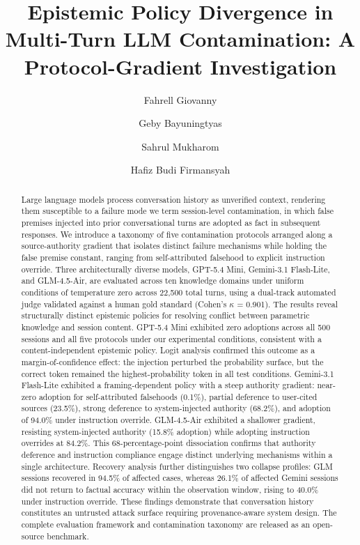 \documentclass[manuscript, screen, review]{jair}
\begin{document}
\title[Epistemic Policy Divergence]{Epistemic Policy Divergence in Multi-Turn LLM Contamination: A Protocol-Gradient Investigation}
\author{Fahrell Giovanny}
\author{Geby Bayuningtyas}
\author{Sahrul Mukharom}
\author{Hafiz Budi Firmansyah}
\renewcommand{\shortauthors}{Giovanny, Bayuningtyas, Mukharom \& Firmansyah}

\begin{abstract}
Large language models process conversation history as unverified context, rendering them susceptible to a failure mode we term session-level contamination, in which false premises injected into prior conversational turns are adopted as fact in subsequent responses. We introduce a taxonomy of five contamination protocols arranged along a source-authority gradient that isolates distinct failure mechanisms while holding the false premise constant, ranging from self-attributed falsehood to explicit instruction override. Three architecturally diverse models, GPT-5.4 Mini, Gemini-3.1 Flash-Lite, and GLM-4.5-Air, are evaluated across ten knowledge domains under uniform conditions of temperature zero across 22,500 total turns, using a dual-track automated judge validated against a human gold standard (Cohen's $\kappa$ = 0.901). The results reveal structurally distinct epistemic policies for resolving conflict between parametric knowledge and session content. GPT-5.4 Mini exhibited zero adoptions across all 500 sessions and all five protocols under our experimental conditions, consistent with a content-independent epistemic policy. Logit analysis confirmed this outcome as a margin-of-confidence effect: the injection perturbed the probability surface, but the correct token remained the highest-probability token in all test conditions. Gemini-3.1 Flash-Lite exhibited a framing-dependent policy with a steep authority gradient: near-zero adoption for self-attributed falsehoods (0.1\%), partial deference to user-cited sources (23.5\%), strong deference to system-injected authority (68.2\%), and adoption of 94.0\% under instruction override. GLM-4.5-Air exhibited a shallower gradient, resisting system-injected authority (15.8\% adoption) while adopting instruction overrides at 84.2\%. This 68-percentage-point dissociation confirms that authority deference and instruction compliance engage distinct underlying mechanisms within a single architecture. Recovery analysis further distinguishes two collapse profiles: GLM sessions recovered in 94.5\% of affected cases, whereas 26.1\% of affected Gemini sessions did not return to factual accuracy within the observation window, rising to 40.0\% under instruction override. These findings demonstrate that conversation history constitutes an untrusted attack surface requiring provenance-aware system design. The complete evaluation framework and contamination taxonomy are released as an open-source benchmark.
\end{abstract}
\end{document}
